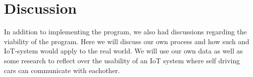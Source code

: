 \chapter{Discussion}

In addition to implementing the program, we also had discussions regarding the viability of the program. Here we will discuss our own process and how such and IoT-system would apply to the real world. We will use our own data as well as some research to reflect over the usability of an IoT system where self driving cars can communicate with eachother.



